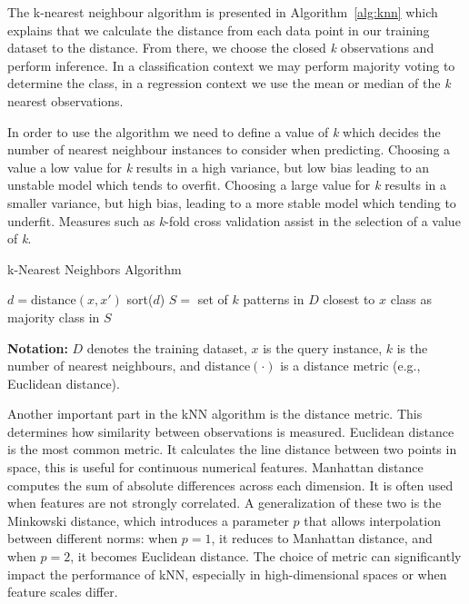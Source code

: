 \documentclass[conference]{IEEEtran}
\begin{document}
The k-nearest neighbour algorithm is presented in Algorithm~\ref{alg:knn} which explains that we calculate the distance from each data point in our training dataset to the distance. From there, we choose the closed \textit{k} observations and perform inference. In a classification context we may perform majority voting to determine the class, in a regression context we use the mean or median of the \textit{k} nearest observations.

In order to use the algorithm we need to define a value of \textit{k} which decides the number of nearest neighbour instances to consider when predicting. Choosing a value a low value for \textit{k} results in a high variance, but low bias leading to an unstable model which tends to overfit. Choosing a large value for \textit{k} results in a smaller variance, but high bias, leading to a more stable model which tending to underfit. Measures such as \textit{k}-fold cross validation assist in the selection of a value of \textit{k}.

\begin{algorithm}[htbp]
\caption{k-Nearest Neighbors Algorithm}
\label{alg:knn}
\begin{algorithmic}
\State $d = \text{distance}(x, x')$
\EndFor
\State sort($d$)
\State $S = $ set of $k$ patterns in $D$ closest to $x$
\State \Return class as majority class in $S$
\EndFunction
\end{algorithmic}
\end{algorithm}
\noindent
\textbf{Notation:} $D$ denotes the training dataset, $x$ is the query instance, $k$ is the number of nearest neighbours, and $\text{distance}(\cdot)$ is a distance metric (e.g., Euclidean distance).

Another important part in the kNN algorithm is the distance metric. This determines how similarity between observations is measured. Euclidean distance is the most common metric. It calculates the line distance between two points in space, this is useful for continuous numerical features. Manhattan distance computes the sum of absolute differences across each dimension. It is often used when features are not strongly correlated. A generalization of these two is the Minkowski distance, which introduces a parameter \(p\) that allows interpolation between different norms: when \(p = 1\), it reduces to Manhattan distance, and when \(p = 2\), it becomes Euclidean distance. The choice of metric can significantly impact the performance of kNN, especially in high-dimensional spaces or when feature scales differ.
\end{document}
